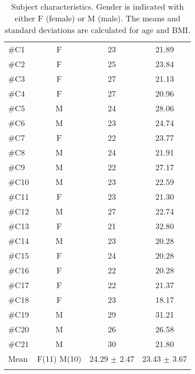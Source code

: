 \begin{longtable}{l|c|c|c}
	\rowcolor[HTML]{C0C0C0} \rule{0pt}{3ex}  \color[HTML]{000000}{Subject} & \color[HTML]{000000}{Gender} & \color[HTML]{000000}{Age}  &  \color[HTML]{000000}{BMI} 
	\\ \hline \rule{0pt}{3ex} 
\#C1 &  F & 23 & 21.89 \\ \hline \hline \rule{0pt}{3ex} 
\#C2 & F & 25 & 23.84 \\ \hline \hline \rule{0pt}{3ex} 
\#C3 & F & 27 & 21.13 \\ \hline \hline \rule{0pt}{3ex} 
\#C4 & F & 27 & 20.96\\ \hline \hline \rule{0pt}{3ex} 
\#C5 & M & 24 & 28.06 \\ \hline \hline \rule{0pt}{3ex} 
\#C6 & M & 23 &  24.74 \\ \hline \hline \rule{0pt}{3ex} 
\#C7 & F & 22 & 23.77 \\ \hline \hline \rule{0pt}{3ex} 
	\#C8 & M & 24 & 21.91 \\ \hline \hline \rule{0pt}{3ex} 
	\#C9 & M & 22 & 27.17  \\ \hline \hline \rule{0pt}{3ex} 
	\#C10 & M & 23 &  22.59 \\ \hline \hline \rule{0pt}{3ex} 
\#C11 & F & 23  & 21.30 \\ \hline \hline \rule{0pt}{3ex} 
\#C12 & M & 27 & 22.74 \\ \hline \hline \rule{0pt}{3ex} 
\#C13 & F  & 21 & 32.80  \\ \hline \hline \rule{0pt}{3ex} 
\#C14 & M &  23 & 20.28 \\ \hline \hline \rule{0pt}{3ex} 
\#C15 & F & 24 &  20.28 \\ \hline \hline \rule{0pt}{3ex} 
	\#C16 & F & 22  & 20.28 \\ \hline \hline \rule{0pt}{3ex} 
	\#C17 & F  & 22 &  21.37\\ \hline \hline \rule{0pt}{3ex} 
	\#C18 & F & 23  & 18.17   \\ \hline \hline \rule{0pt}{3ex}
		\#C19 &  M & 29 & 31.21 \\ \hline \hline \rule{0pt}{3ex} 
	\#C20 & M & 26 & 26.58  \\ \hline \hline \rule{0pt}{3ex}  	
	\#C21 & M & 30 & 21.80  \\ \hline \hline \rule{0pt}{3ex}  
Mean & F(11) M(10) & 24.29 $\pm$ 2.47 & 23.43 $\pm$ 3.67
	\\ \hline 	
	\caption{Subject characteristics. Gender is indicated with either F (female) or M (male). The means and standard deviations are calculated for age and BMI.}
	\label{tab:subjects}
\end{longtable}
\vspace{-.5cm}
